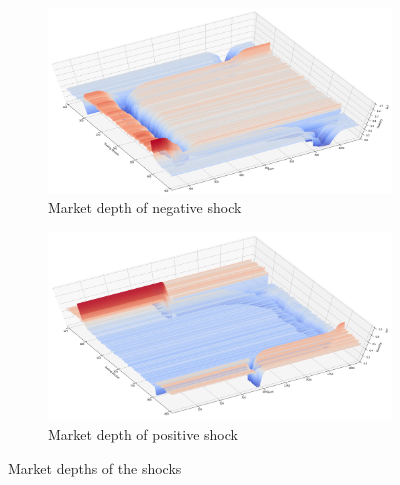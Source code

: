
\begin{figure}
    \centering
    \begin{subfigure}{.5\textwidth}
      \centering
      \includegraphics[width=\linewidth]{plots/shocks_neg_market_depth_in_equilibrium.png}
      \caption{Market depth of negative shock}
      \label{fig:market_depth_neg_shock}
    \end{subfigure}%
    \begin{subfigure}{.5\textwidth}
      \centering
      \includegraphics[width=\linewidth]{plots/shocks_pos_market_depth_in_equilibrium.png}
      \caption{Market depth of positive shock}
      \label{fig:market_depth_pos_shock}
    \end{subfigure}
    \caption{Market depths of the shocks}
    \label{fig:market_depths_shocks}
\end{figure}


